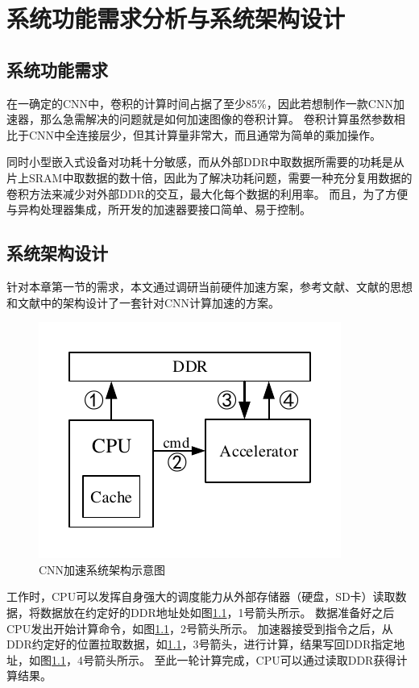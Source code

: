 \chapter{系统功能需求分析与系统架构设计}

\section{系统功能需求}
在一确定的CNN中，卷积的计算时间占据了至少85\%\cite{chen2017eyeriss}，因此若想制作一款CNN加速器，那么急需解决的问题就是如何加速图像的卷积计算。
卷积计算虽然参数相比于CNN中全连接层少，但其计算量非常大，而且通常为简单的乘加操作。

同时小型嵌入式设备对功耗十分敏感，而从外部DDR中取数据所需要的功耗是从片上SRAM中取数据的数十倍\cite{chen2016eyeriss}，因此为了解决功耗问题，需要一种充分复用数据的卷积方法来减少对外部DDR的交互，最大化每个数据的利用率。
而且，为了方便与异构处理器集成，所开发的加速器要接口简单、易于控制。

\section{系统架构设计}
    针对本章第一节的需求，本文通过调研当前硬件加速方案，参考文献\cite{chen2017eyeriss}、文献\cite{chen2016eyeriss}的思想和文献\cite{sun2018high}中的架构设计了一套针对CNN计算加速的方案。
    \begin{figure}[h]
        \centering
        \includegraphics{../pdf/system.pdf}
        \caption{CNN加速系统架构示意图}
        \label{sys}
    \end{figure}
    工作时，CPU可以发挥自身强大的调度能力从外部存储器（硬盘，SD卡）读取数据，将数据放在约定好的DDR地址处如图\ref{sys}，1号箭头所示。
    数据准备好之后CPU发出开始计算命令，如图\ref{sys}，2号箭头所示。
    加速器接受到指令之后，从DDR约定好的位置拉取数据，如\ref{sys}，3号箭头，进行计算，结果写回DDR指定地址，如图\ref{sys}，4号箭头所示。
    至此一轮计算完成，CPU可以通过读取DDR获得计算结果。

